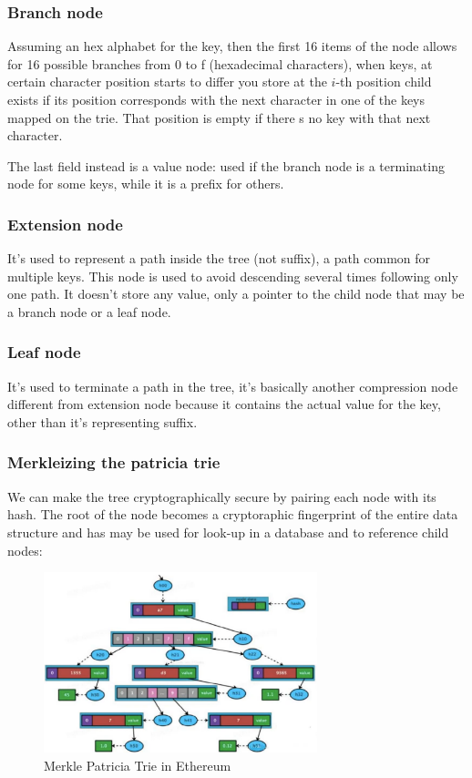 \subsubsection{Branch node}
Assuming an hex alphabet for the key, then the first 16 items of the node allows for 16 possible branches from 0 to f (hexadecimal characters), when keys, at certain character position starts to differ you store at the $i$-th position child exists if its position corresponds with the next character in one of the keys mapped on the trie.
That position is empty if there s no key with that next character.

The last field instead is a value node: used if the branch node is a terminating node for some keys, while it is a prefix for others.

\subsubsection{Extension node}
It's used to represent a path inside the tree (not suffix), a path common for multiple keys.
This node is used to avoid descending several times following only one path.
It doesn't store any value, only a pointer to the child node that may be a branch node or a leaf node.

\subsubsection{Leaf node}
It's used to terminate a path in the tree, it's basically another compression node different from extension node because it contains the actual value for the key, other than it's representing suffix.

\subsubsection{Merkleizing the patricia trie}
We can make the tree cryptographically secure by pairing each node with its hash.
The root of the node becomes a cryptoraphic fingerprint of the entire data structure and has may be used for look-up in a database and to reference child nodes:

\begin{figure}[H]
    \centering
    \includegraphics[width=300px]{images/7_Ethereum/02.png}
    \caption{Merkle Patricia Trie in Ethereum}
\end{figure}

